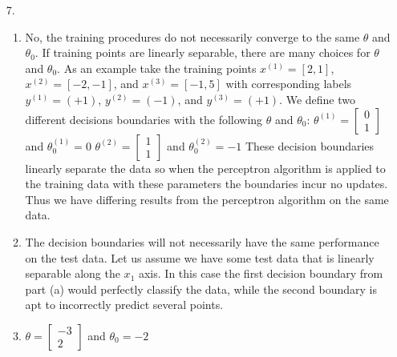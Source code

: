 \documentclass{article}
\begin{document}
\begin{enumerate}
\item[7.]
	\begin{enumerate}
	\item 
		  No, the training procedures do not necessarily converge to the same $\theta$ and $\theta_0$. If training points are linearly separable, there are many choices for $\theta$ and $\theta_0$.
		  \newline\newline
		  As an example take the training points $x^{(1)}=[2,1]$, $x^{(2)}=[-2,-1]$, and $x^{(3)}=[-1,5]$ with corresponding labels $y^{(1)}=(+1)$, $y^{(2)}=(-1)$, and $y^{(3)}=(+1)$.
		  \newline\newline
		  We define two different decisions boundaries with the following $\theta$ and $\theta_0$:
		  \newline\newline
		  $\theta^{(1)} = \left[ \begin{smallmatrix} 0\\1 \end{smallmatrix} \right]$ and $\theta^{(1)}_{0} = 0$
		  \newline\newline
		  $\theta^{(2)} = \left[ \begin{smallmatrix} 1\\1 \end{smallmatrix} \right]$ and $\theta^{(2)}_{0} = -1$
		  \newline\newline
		  These decision boundaries linearly separate the data so when the perceptron algorithm is applied to the training data with these parameters the boundaries incur no updates. Thus we have differing results from the perceptron algorithm on the same data.
	\item 
		  The decision boundaries will not necessarily have the same performance on the test data. Let us assume we have some test data that is linearly separable along the $x_1$ axis. In this case the first decision 		boundary from part (a) would perfectly classify the data, while the second boundary is apt to incorrectly predict several points.  
	\item 
		   $\theta = \left[ \begin{smallmatrix} -3\\2 \end{smallmatrix} \right]$ and $\theta_0 = -2$
	\end{enumerate}

\bigskip


\end{enumerate}
\end{document}
